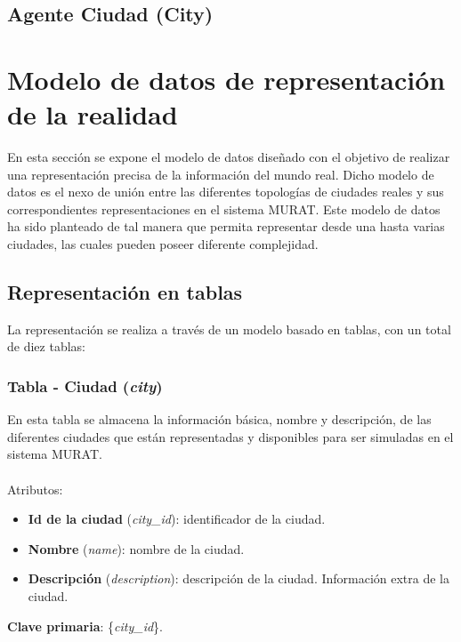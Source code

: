 \subsection{Agente Ciudad (City)}

\renewcommand{\labelitemi}{$\bullet$}
\renewcommand{\labelitemii}{$\circ$}
\renewcommand{\labelitemiii}{$\Rightarrow$}

\newpage
\section{Modelo de datos de representación de la realidad}
En esta sección se expone el modelo de datos diseñado con el objetivo de realizar una representación precisa de la información del mundo real. Dicho modelo de datos es el nexo de unión entre las diferentes topologías de ciudades reales y sus correspondientes representaciones en el sistema MURAT. Este modelo de datos ha sido planteado de tal manera que permita representar desde una hasta varias ciudades, las cuales pueden poseer diferente complejidad.

\subsection{Representación en tablas}
La representación se realiza a través de un modelo basado en tablas, con un total de diez tablas:

\subsubsection{Tabla - Ciudad (\textit{city})}
En esta tabla se almacena la información básica, nombre y descripción, de las diferentes ciudades que están representadas y disponibles para ser simuladas en el sistema MURAT. \\\\
Atributos:
\begin{itemize}
    \item \textbf{Id de la ciudad} (\textit{city\_id}): identificador de la ciudad.
    \item \textbf{Nombre} (\textit{name}): nombre de la ciudad.
    \item \textbf{Descripción} (\textit{description}): descripción de la ciudad. Información extra de la ciudad.
\end{itemize}
\textbf{Clave primaria}: \{\textit{city\_id}\}. \\

